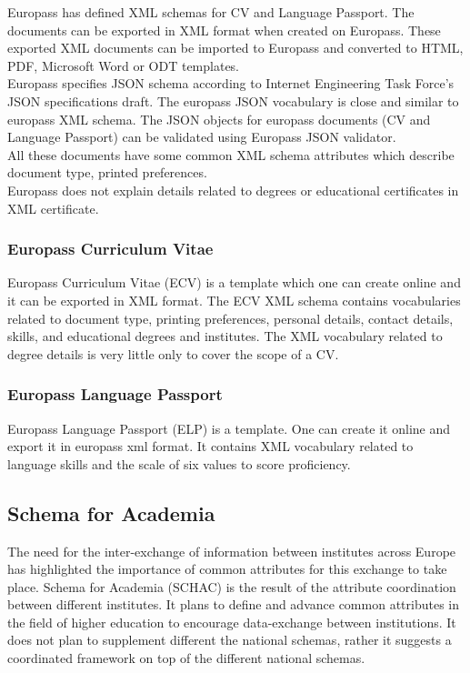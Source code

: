 \documentclass[12pt,a4paper,oneside]{book}
\begin{document}
    Europass has defined XML schemas for CV and Language Passport. The documents can be exported in XML format when created on Europass. These exported XML documents can be imported to Europass and converted to HTML, PDF, Microsoft Word or ODT templates. \\

    Europass specifies JSON schema according to Internet Engineering Task Force's JSON specifications draft. The europass JSON vocabulary is close and similar to europass XML schema. The JSON objects for europass documents (CV and Language Passport) can be validated using Europass JSON validator. \\

    All these documents have some common XML schema attributes which describe document type, printed preferences. \\

    Europass does not explain details related to degrees or educational certificates in XML certificate. 

        \subsubsection{Europass Curriculum Vitae}
        Europass Curriculum Vitae (ECV) is a template which one can create online and it can be exported in XML format. The ECV XML schema contains vocabularies related to document type, printing preferences, personal details, contact details, skills, and educational degrees and institutes. The XML vocabulary related to degree details is very little only to cover the scope of a CV. 

        \subsubsection{Europass Language Passport}
        Europass Language Passport (ELP) is a template. One can create it online and export it in europass xml format. It contains XML vocabulary related to language skills and the scale of six values to score proficiency. 

    \subsection{Schema for Academia \cite{SCHAC 1.5.0}} 
    The need for the inter-exchange of information between institutes across Europe has highlighted the importance of common attributes for this exchange to take place. Schema for Academia (SCHAC) is the result of the attribute coordination between different institutes. It plans to define and advance common attributes in the field of higher education to encourage data-exchange between institutions. It does not plan to supplement different the national schemas, rather it suggests a coordinated framework on top of the different national schemas. \\
    
\end{document}
